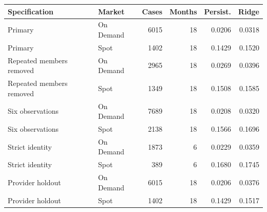 \begin{tabular}{llrrrr}
\toprule
Specification & Market & Cases & Months & Persist. & Ridge \\
\midrule
Primary & On Demand & 6015 & 18 & 0.0206 & 0.0318 \\
Primary & Spot & 1402 & 18 & 0.1429 & 0.1520 \\
Repeated members removed & On Demand & 2965 & 18 & 0.0269 & 0.0396 \\
Repeated members removed & Spot & 1349 & 18 & 0.1508 & 0.1585 \\
Six observations & On Demand & 7689 & 18 & 0.0208 & 0.0320 \\
Six observations & Spot & 2138 & 18 & 0.1566 & 0.1696 \\
Strict identity & On Demand & 1873 & 6 & 0.0229 & 0.0359 \\
Strict identity & Spot & 389 & 6 & 0.1680 & 0.1745 \\
Provider holdout & On Demand & 6015 & 18 & 0.0206 & 0.0376 \\
Provider holdout & Spot & 1402 & 18 & 0.1429 & 0.1517 \\
\bottomrule
\end{tabular}
